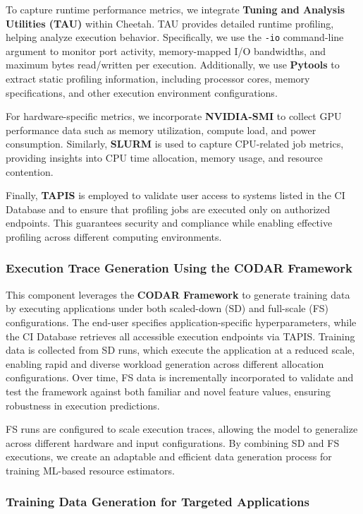To capture runtime performance metrics, we integrate \textbf{Tuning and Analysis Utilities (TAU)} within Cheetah. TAU provides detailed runtime profiling, helping analyze execution behavior. Specifically, we use the \texttt{-io} command-line argument to monitor port activity, memory-mapped I/O bandwidths, and maximum bytes read/written per execution. Additionally, we use \textbf{Pytools} to extract static profiling information, including processor cores, memory specifications, and other execution environment configurations.

For hardware-specific metrics, we incorporate \textbf{NVIDIA-SMI} to collect GPU performance data such as memory utilization, compute load, and power consumption. Similarly, \textbf{SLURM} is used to capture CPU-related job metrics, providing insights into CPU time allocation, memory usage, and resource contention.

Finally, \textbf{TAPIS} is employed to validate user access to systems listed in the CI Database and to ensure that profiling jobs are executed only on authorized endpoints. This guarantees security and compliance while enabling effective profiling across different computing environments.

\subsubsection{Execution Trace Generation Using the CODAR Framework}

This component leverages the \textbf{CODAR Framework} to generate training data by executing applications under both scaled-down (SD) and full-scale (FS) configurations. The end-user specifies application-specific hyperparameters, while the CI Database retrieves all accessible execution endpoints via TAPIS. Training data is collected from SD runs, which execute the application at a reduced scale, enabling rapid and diverse workload generation across different allocation configurations. Over time, FS data is incrementally incorporated to validate and test the framework against both familiar and novel feature values, ensuring robustness in execution predictions.

FS runs are configured to scale execution traces, allowing the model to generalize across different hardware and input configurations. By combining SD and FS executions, we create an adaptable and efficient data generation process for training ML-based resource estimators.

\subsubsection{Training Data Generation for Targeted Applications}

